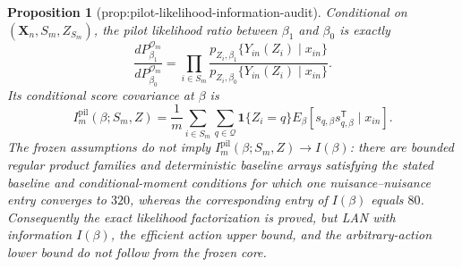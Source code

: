 \documentclass{article}
\newtheorem{proposition}{Proposition}
\begin{document}
\begin{proposition}[prop:pilot-likelihood-information-audit]\label{prop:pilot-likelihood-information-audit}
Conditional on \((\mathbf X_n,S_m,Z_{S_m})\), the pilot likelihood ratio between \(\beta_1\) and \(\beta_0\) is exactly
\[
\frac{dP_{\beta_1}^{\mathcal O_m}}
     {dP_{\beta_0}^{\mathcal O_m}}
=\prod_{i\in S_m}
\frac{p_{Z_i,\beta_1}\{Y_{in}(Z_i)\mid x_{in}\}}
     {p_{Z_i,\beta_0}\{Y_{in}(Z_i)\mid x_{in}\}}.
\]
Its conditional score covariance at \(\beta\) is
\[
I_m^{\mathrm{pil}}(\beta;S_m,Z)
=\frac1m\sum_{i\in S_m}\sum_{q\in\mathcal Q}
\mathbf 1\{Z_i=q\}
E_\beta\!\left[
s_{q,\beta}s_{q,\beta}^{\mathsf T}\mid x_{in}
\right].
\]
The frozen assumptions do not imply
\(I_m^{\mathrm{pil}}(\beta;S_m,Z)\to I(\beta)\): there are bounded regular product families and deterministic baseline arrays satisfying the stated baseline and conditional-moment conditions for which one nuisance--nuisance entry converges to \(320\), whereas the corresponding entry of \(I(\beta)\) equals \(80\).  Consequently the exact likelihood factorization is proved, but LAN with information \(I(\beta)\), the efficient action upper bound, and the arbitrary-action lower bound do not follow from the frozen core.
\end{proposition}
\end{document}
